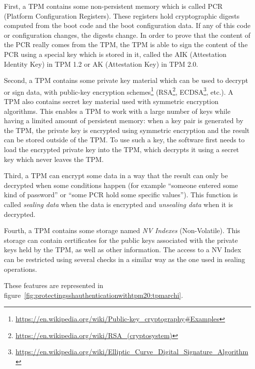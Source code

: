 First, a TPM contains some non-persistent memory which is called PCR
(Platform Configuration Registers). These registers hold cryptographic
digests computed from the boot code and the boot configuration data. If
any of this code or configuration changes, the digests change. In order
to prove that the content of the PCR really comes from the TPM, the TPM
is able to sign the content of the PCR using a special key which is
stored in it, called the AIK (Attestation Identity Key) in TPM 1.2 or AK
(Attestation Key) in TPM 2.0.

Second, a TPM contains some private key material which can be used to
decrypt or sign data, with public-key encryption schemes\footnote{\url{https://en.wikipedia.org/wiki/Public-key_cryptography\#Examples}}
(RSA\footnote{\url{https://en.wikipedia.org/wiki/RSA_(cryptosystem)}},
ECDSA\footnote{\url{https://en.wikipedia.org/wiki/Elliptic_Curve_Digital_Signature_Algorithm}},
etc.). A TPM also contains secret key material used with symmetric
encryption algorithms. This enables a TPM to work with a large number of
keys while having a limited amount of persistent memory: when a key pair
is generated by the TPM, the private key is encrypted using symmetric
encryption and the result can be stored outside of the TPM. To use such
a key, the software first needs to load the encrypted private key into
the TPM, which decrypts it using a secret key which never leaves the
TPM.

Third, a TPM can encrypt some data in a way that the result can only be
decrypted when some conditions happen (for example ``someone entered
some kind of password'' or ``some PCR hold some specific values''). This
function is called \emph{sealing data} when the data is encrypted and
\emph{unsealing data} when it is decrypted.

Fourth, a TPM contains some storage named \emph{NV Indexes}
(Non-Volatile). This storage can contain certificates for the public
keys associated with the private keys held by the TPM, as well as other
information. The access to a NV Index can be restricted using several
checks in a similar way as the one used in sealing operations.

These features are represented in
figure~\ref{fig:protectingsshauthenticationwithtpm20:tpmarchi}.


